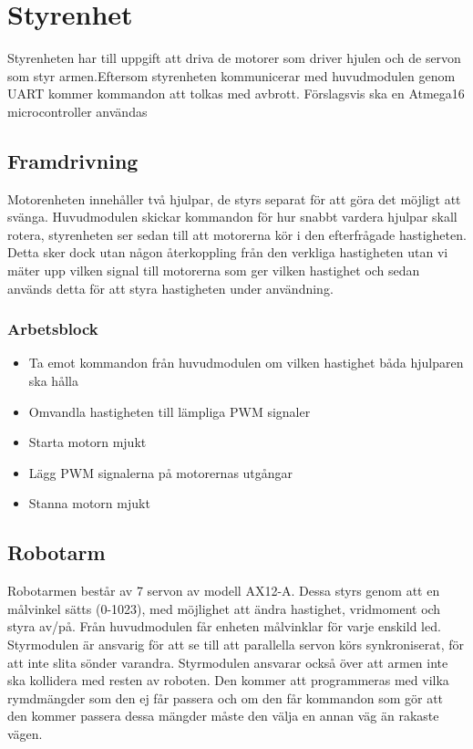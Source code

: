 
\section{Styrenhet}

Styrenheten har till uppgift att driva de motorer som driver hjulen och de servon som styr armen.Eftersom styrenheten kommunicerar med huvudmodulen genom UART kommer kommandon att tolkas med avbrott. Förslagsvis ska en Atmega16 microcontroller användas

\subsection{Framdrivning}

Motorenheten innehåller två hjulpar, de styrs separat för att göra det möjligt att svänga. Huvudmodulen skickar kommandon för hur snabbt vardera hjulpar skall rotera, styrenheten ser sedan till att motorerna kör i den efterfrågade hastigheten. Detta sker dock utan någon återkoppling från den verkliga hastigheten utan vi mäter upp vilken signal till motorerna som ger vilken hastighet och sedan används detta för att styra hastigheten under användning.

\subsubsection{Arbetsblock}
\begin{itemize}
\item Ta emot kommandon från huvudmodulen om vilken hastighet båda hjulparen ska hålla
\item Omvandla hastigheten till lämpliga PWM signaler
\item Starta motorn mjukt 
\item Lägg PWM signalerna på motorernas utgångar 
\item Stanna motorn mjukt
\end{itemize}

\subsection{Robotarm}

Robotarmen består av 7 servon av modell AX12-A. Dessa styrs genom att en målvinkel sätts (0-1023), med möjlighet att ändra hastighet, vridmoment och styra av/på. Från huvudmodulen får enheten målvinklar för varje enskild led. Styrmodulen är ansvarig för att se till att parallella servon körs synkroniserat, för att inte slita sönder varandra. Styrmodulen ansvarar också över att armen inte ska kollidera med resten av roboten. Den kommer att programmeras med vilka rymdmängder som den ej får passera och om den får kommandon som gör att den kommer passera dessa mängder måste den välja en annan väg än rakaste vägen.  

